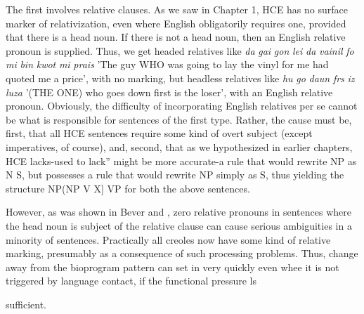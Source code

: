 The first involves relative clauses. As we saw in Chapter 1, HCE has no surface marker of relativization, even where English obligatorily requires one, provided that there is a head noun. If there is not a head noun, then an English relative pronoun is supplied. Thus, we get headed relatives like \textit{da} \textit{gai} \textit{gon} \textit{lei} \textit{da} \textit{vainil} \textit{fo} \textit{mi} \textit{bin} \textit{kwot} \textit{mi} \textit{prais} 'The guy WHO was going to lay the vinyl for me had quoted me a price', with no marking, but headless relatives like \textit{hu} \textit{go} \textit{daun} \textit{frs} \textit{iz} \textit{luza} '(THE ONE) who goes down first is the loser', with an English relative pro\-noun. Obviously, the difficulty of incorporating English relatives per se cannot be what is responsible for sentences of the first type. Rather, the cause must be, first, that all HCE sentences require some kind of overt subject (except imperatives, of course), and, second, that as we hypothesized in earlier chapters, HCE lacks-{\textquotedbl}used to lack'' might be more accurate-a rule that would rewrite NP as N S, but possesses a rule that would rewrite NP simply as S, thus yielding the structure NP(NP V X] VP for both the above sentences.


However, as was shown in Bever and \citet{Langendoen1971}, zero relative pronouns in sentences where the head noun is subject of the relative clause can cause serious ambiguities in a minority of sentences. Practically all creoles now have some kind of relative marking, pre\-sumably as a consequence of such processing problems. Thus, change away from the bioprogram pattern can set in very quickly even whee it is not triggered by language contact, if the functional pressure ls

sufficient.

